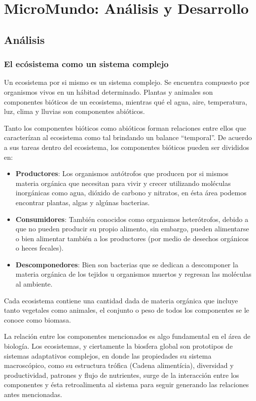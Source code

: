 \chapter{MicroMundo: Análisis y Desarrollo}
  \section{Análisis}
    \subsection{El ecósistema como un sistema complejo}
      Un ecosistema por si mismo es un sistema complejo. Se encuentra compuesto por organismos vivos en un hábitad determinado. Plantas y animales son componentes bióticos de un ecosistema, mientras qué el agua, aire, temperatura, luz, clima y lluvias son componentes abióticos.

      Tanto los componentes bióticos como abióticos forman relaciones entre ellos que caracterízan al ecosistema como tal brindando un balance ``temporal''. De acuerdo a sus tareas dentro del ecosistema, los componentes bióticos pueden ser divididos en:

      \begin{itemize}
        \item \textbf{Productores}: Los organismos autótrofos que producen por si mismos materia orgánica que necesitan para vivir y crecer utilizando moléculas inorgánicas como agua, dióxido de carbono y nitratos, en ésta área podemos encontrar plantas, algas y algúnas bacterias.
        \item \textbf{Consumidores}: También conocidos como organismos heterótrofos, debido a que no pueden producir su propio alimento, sin embargo, pueden alimentarse o bien alimentar también a los productores (por medio de desechos orgánicos o heces fecales).
        \item \textbf{Descomponedores}: Bien son bacterias que se dedican a descomponer la materia orgánica de los tejidos u organismos muertos y regresan las moléculas al ambiente.
      \end{itemize}

      Cada ecosistema contiene una cantidad dada de materia orgánica que incluye tanto vegetales como animales, el conjunto o peso de todos los componentes se le conoce como biomasa.\cite{6}

      La relación entre los componentes mencionados es algo fundamental en el área de biología. Los ecosistemas, y ciertamente la biosfera global son prototipos de sistemas adaptativos complejos, en donde las propiedades su sistema macroscópico, como su estructura trófica (Cadena alimentícia), diversidad y productividad, patrones y flujo de nutrientes, surge de la interacción entre los componentes y ésta retroalimenta al sistema para seguir generando las relaciones antes mencionadas.

